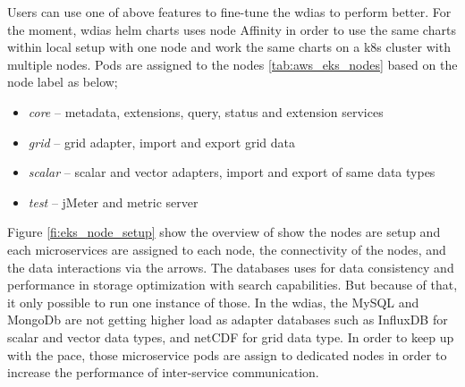 Users can use one of above features to fine-tune the \acrshort{wdias} to perform better. For the moment, \acrshort{wdias} helm charts uses node Affinity in order to use the same charts within local setup with one node and work the same charts on a \acrshort{k8s} cluster with multiple nodes. Pods are assigned to the nodes \ref{tab:aws_eks_nodes} based on the node label as below;
\begin{itemize}
    \item \emph{core} -- metadata, extensions, query, status and extension services
    \item \emph{grid} -- grid adapter, import and export grid data
    \item \emph{scalar} -- scalar and vector adapters, import and export of same data types
    \item \emph{test} -- jMeter and metric server
\end{itemize}
Figure \ref{fi:eks_node_setup} show the overview of show the nodes are setup and each microservices are assigned to each node, the connectivity of the nodes, and the data interactions via the arrows.
The databases uses for data consistency and performance in storage optimization with search capabilities. But because of that, it only possible to run one instance of those. In the \acrshort{wdias}, the MySQL and MongoDb are not getting higher load as adapter databases such as InfluxDB for scalar and vector data types, and netCDF for grid data type. In order to keep up with the pace, those microservice pods are assign to dedicated nodes in order to increase the performance of inter-service communication.
